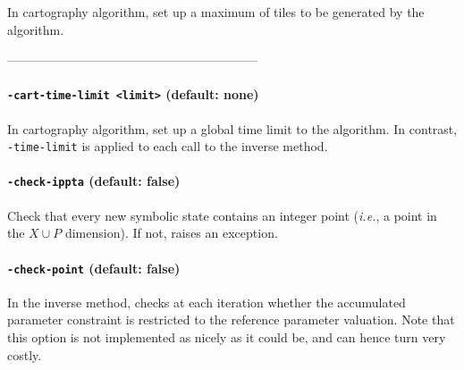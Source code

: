 \documentclass[a4paper,11pt]{report}
\makeatletter
\newcommand{\Clock}{X} %
\newcommand{\Param}{P} %
\newcommand{\styleOption}[1]{\textcolor{optioncolor}{\texttt{#1}}}
\newcommand{\ie}{\textcolor{colorok}{\textit{i.e.},\@}}
\makeatother
\begin{document}
In cartography algorithm, set up a maximum of tiles to be generated by the algorithm.


------------------------------------------------------------
\paragraph{\styleOption{-cart-time-limit <limit>} (default: none)}

In cartography algorithm, set up a global time limit to the algorithm.
In contrast, \styleOption{-time-limit} is applied to each call to the inverse method.


\paragraph{\styleOption{-check-ippta} (default: false)}

Check that every new symbolic state contains an integer point (\ie{} a point in the $\Clock \cup \Param$ dimension).
If not, raises an exception.


\paragraph{\styleOption{-check-point} (default: false)}

In the inverse method, checks at each iteration whether the accumulated parameter constraint is restricted to the reference parameter valuation.
Note that this option is not implemented as nicely as it could be, and can hence turn very costly.


% 


\end{document}
